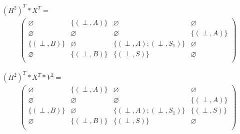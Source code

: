 \documentclass[12pt]{article}  %
\theoremstyle{definition}
\theoremstyle{remark}
\begin{document}
$(H^2)^T * X^T =$
\begin{align*}
\begin{pmatrix}
      \varnothing            & \{ (\perp,A) \}            & \varnothing            & \varnothing            \\
      \varnothing        & \varnothing            & \varnothing                & \{ (\perp,A) \}            \\
      \{ (\perp,B) \}            & \varnothing            & \{ (\perp,A);(\perp,S_1) \}            & \varnothing      \\
      \varnothing            & \{ (\perp,B) \}            & \{ (\perp,S) \}      & \varnothing  \\
\end{pmatrix}
\end{align*}



$(H^2)^T * X^T * V^2 =$
\begin{align*}
\begin{pmatrix}
      \varnothing            & \{ (\perp,A) \}            & \varnothing            & \varnothing            \\
      \varnothing        & \varnothing            & \varnothing                & \{ (\perp,A) \}            \\
      \{ (\perp,B) \}            & \varnothing            & \{ (\perp,A);(\perp,S_1) \}            & \{ (\perp,S) \}     \\
      \varnothing            & \{ (\perp,B) \}            & \{ (\perp,S) \}      & \varnothing  \\
\end{pmatrix}
\end{align*}
\end{document}
